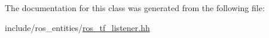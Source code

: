The documentation for this class was generated from the following file\+:\begin{DoxyCompactItemize}
\item 
include/ros\+\_\+entities/\hyperlink{ros__tf__listener_8hh}{ros\+\_\+tf\+\_\+listener.\+hh}\end{DoxyCompactItemize}
